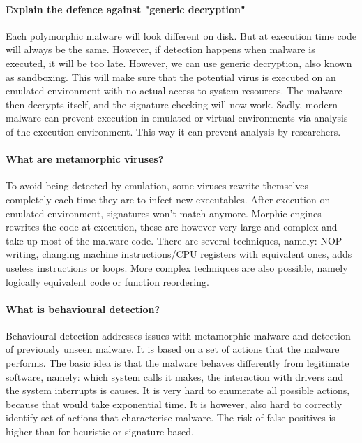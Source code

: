 \paragraph{Explain the defence against "generic decryption"}
Each polymorphic malware will look different on disk. But at execution time code will always be the same. However, if detection happens when malware is executed, it will be too late. However, we can use generic decryption, also known as sandboxing. This will make sure that the potential virus is executed on an emulated environment with no actual access to system resources. The malware then decrypts itself, and the signature checking will now work. Sadly, modern malware can prevent execution in emulated or virtual environments via analysis of the execution environment. This way it can prevent analysis by researchers.

\paragraph{What are metamorphic viruses?}
To avoid being detected by emulation, some viruses rewrite themselves completely each time they are to infect new executables. After execution on emulated environment, signatures won't match anymore. Morphic engines rewrites the code at execution, these are however very large and complex and take up most of the malware code. There are several techniques, namely: NOP writing, changing machine instructions/CPU registers with equivalent ones, adds useless instructions or loops. More complex techniques are also possible, namely logically equivalent code or function reordering.

\paragraph{What is behavioural detection?}
Behavioural detection addresses issues with metamorphic malware and detection of previously unseen malware. It is based on a set of actions that the malware performs. The basic idea is that the malware behaves differently from legitimate software, namely: which system calls it makes, the interaction with drivers and the system interrupts is causes. It is very hard to enumerate all possible actions, because that would take exponential time. It is however, also hard to correctly identify set of actions that characterise malware. The risk of false positives is higher than for heuristic or signature based.

